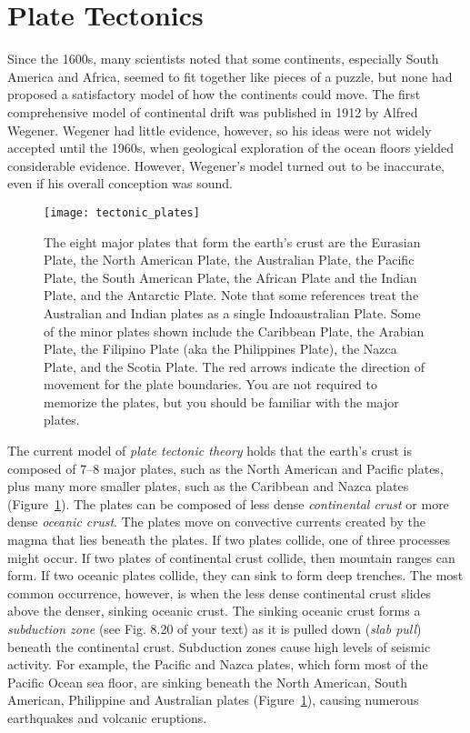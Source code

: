 \documentclass[11pt, hidelinks]{article}
\begin{document}
\section{Plate Tectonics}

Since the 1600s, many scientists noted that some continents, especially South America and Africa, seemed to fit together like pieces of a puzzle, but none had proposed a satisfactory model of how the continents could move. The first comprehensive model of continental drift was published in 1912 by Alfred Wegener. Wegener had little evidence, however, so his ideas were not widely accepted until the 1960s, when geological exploration of the ocean floors yielded considerable evidence. However, Wegener's model turned out to be inaccurate, even if his overall conception was sound.

\begin{figure}[tb]
	\centering
		\texttt{[image: tectonic\_plates]}  
		\caption{The eight major plates that form the earth's crust are the Eurasian Plate, the North American Plate, the Australian Plate, the Pacific Plate, the South American Plate, the African Plate and the Indian Plate, and the Antarctic Plate. Note that some references treat the Australian and Indian plates as a single Indoaustralian Plate. Some of the minor plates shown include the Caribbean Plate, the Arabian Plate, the Filipino Plate (aka the Philippines Plate), the Nazca Plate, and the Scotia Plate. The red arrows indicate the direction of movement for the plate boundaries. You are not required to memorize the plates, but you should be familiar with the major plates.\label{tectonic plates}}
		
\end{figure}

The current model of \emph{plate tectonic theory} holds that the earth's crust is composed of 7--8  major plates, such as the North American and Pacific plates, plus many more smaller plates, such as the Caribbean and Nazca plates (Figure~\ref{tectonic plates}). The plates can be composed of less dense \emph{continental crust} or more dense \emph{oceanic crust}.  The plates move on convective currents created by the magma that lies beneath the plates. If two plates collide, one of three processes might occur. If two plates of continental crust collide, then mountain ranges can form. If two oceanic plates collide, they can sink to form deep trenches. The most common occurrence, however, is when the less dense continental crust slides above the denser, sinking oceanic crust. The sinking oceanic crust forms a \emph{subduction zone} (see Fig. 8.20 of your text) as it is pulled down (\emph{slab pull}) beneath the continental crust. Subduction zones cause high levels of seismic activity. For example, the Pacific and Nazca plates, which form most of the Pacific Ocean sea floor, are sinking beneath the North American, South American, Philippine and Australian plates (Figure~\ref{tectonic plates}), causing numerous earthquakes and volcanic eruptions. 
\end{document}
